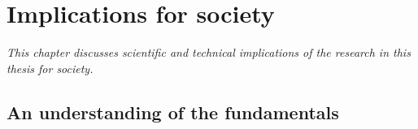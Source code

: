 




\chapter{Implications for society}

\textit{This chapter discusses scientific and technical implications of the research in this thesis for society.}


\section{An understanding of the fundamentals}
\label{section:society:fundamentals}

